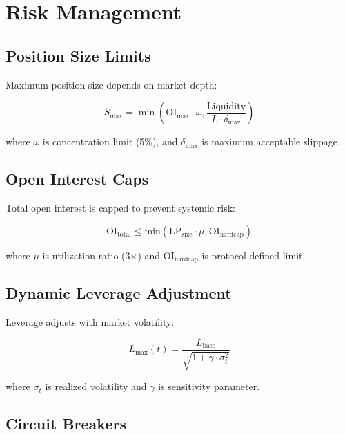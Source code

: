 \section{Risk Management}


\subsection{Position Size Limits}

Maximum position size depends on market depth:

\begin{equation}
S_{\text{max}} = \min\left(\text{OI}_{\text{max}} \cdot \omega, \frac{\text{Liquidity}}{L \cdot \delta_{\text{max}}}\right)
\end{equation}

where $\omega$ is concentration limit (5\%), and $\delta_{\text{max}}$ is maximum acceptable slippage.

\subsection{Open Interest Caps}

Total open interest is capped to prevent systemic risk:

\begin{equation}
\text{OI}_{\text{total}} \leq \text{min}(\text{LP}_{\text{size}} \cdot \mu, \text{OI}_{\text{hardcap}})
\end{equation}

where $\mu$ is utilization ratio (3$\times$) and $\text{OI}_{\text{hardcap}}$ is protocol-defined limit.

\subsection{Dynamic Leverage Adjustment}

Leverage adjusts with market volatility:

\begin{equation}
L_{\text{max}}(t) = \frac{L_{\text{base}}}{\sqrt{1 + \gamma \cdot \sigma_t^2}}
\end{equation}

where $\sigma_t$ is realized volatility and $\gamma$ is sensitivity parameter.

\subsection{Circuit Breakers}

